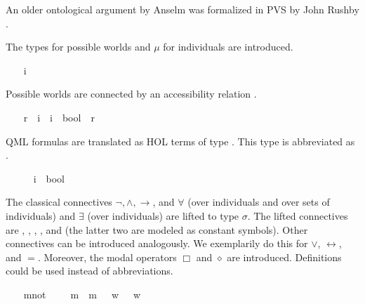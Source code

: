 \begin{isabellebody}
\begin{isamarkuptext}
 An older ontological argument by Anselm was formalized in PVS by John Rushby \cite{rushby}.%
\end{isamarkuptext}%
\isamarkuptrue%
%
\isamarkuptrue%
%
\begin{isamarkuptext}%
The types  for possible worlds and $\mu$ for individuals 
are introduced.%
\end{isamarkuptext}%
\isamarkuptrue%
\ \ \isamarkupfalse%
\ i\ \ \ \ %
\ \isanewline
\ \ \isamarkupfalse%
\ {\isasymmu}\ \ \ \ %
%
\begin{isamarkuptext}%
Possible worlds are connected by an accessibility relation .%
\end{isamarkuptext}%
\isamarkuptrue%
\ \ \isamarkupfalse%
\ r\ {\isacharcolon}{\isacharcolon}\ {\isachardoublequoteopen}i\ {\isasymRightarrow}\ i\ {\isasymRightarrow}\ bool{\isachardoublequoteclose}\ {\isacharparenleft}\ {\isachardoublequoteopen}r{\isachardoublequoteclose}\ {}{}{\isacharparenright}\ \ \ \ %
%
\begin{isamarkuptext}%
QML formulas are translated as HOL terms of type . 
This type is abbreviated as \isa{{\isasymsigma}}.%
\end{isamarkuptext}%
\isamarkuptrue%
\ \ \isamarkupfalse%
\ {\isasymsigma}\ {\isacharequal}\ {\isachardoublequoteopen}{\isacharparenleft}i\ {\isasymRightarrow}\ bool{\isacharparenright}{\isachardoublequoteclose}%
\begin{isamarkuptext}%
The classical connectives $\neg, \wedge, \rightarrow$, and $\forall$
(over individuals and over sets of individuals) and $\exists$ (over individuals) are
lifted to type $\sigma$. The lifted connectives are , , ,
\isa{{\isasymforall}}, and \isa{{\isasymexists}} (the latter two are modeled as constant symbols). 
Other connectives can be introduced analogously. We exemplarily do this for $\vee$, 
$\leftrightarrow$, and $=$. Moreover, the modal operators $\Box$ and $\diamond$ are introduced.
Definitions could be used instead of abbreviations.%
\end{isamarkuptext}%
\isamarkuptrue%
\ \ \isamarkupfalse%
\ mnot\ {\isacharcolon}{\isacharcolon}\ {\isachardoublequoteopen}{\isasymsigma}\ {\isasymRightarrow}\ {\isasymsigma}{\isachardoublequoteclose}\ {\isacharparenleft}{\isachardoublequoteopen}m{\isasymnot}{\isachardoublequoteclose}{\isacharparenright}\ \ {\isachardoublequoteopen}m{\isasymnot}\ {\isasymphi}\ {\isasymequiv}\ {\isacharparenleft}{\isasymlambda}w{\isachardot}\ {\isasymnot}\ {\isasymphi}\ w{\isacharparenright}{\isachardoublequoteclose}\ \ \ \ \isanewline

\end{isabellebody}
